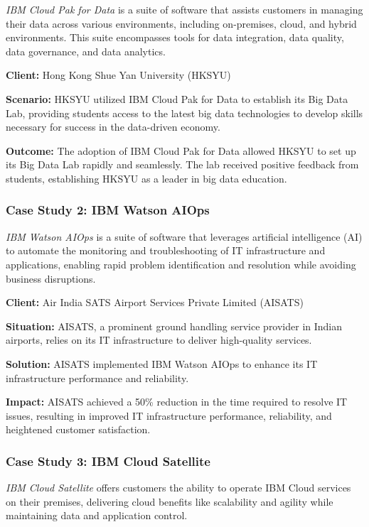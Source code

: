 \textit{IBM Cloud Pak for Data} is a suite of software that assists customers in managing their data across various environments, including on-premises, cloud, and hybrid environments. This suite encompasses tools for data integration, data quality, data governance, and data analytics.

\textbf{Client:} Hong Kong Shue Yan University (HKSYU)

\textbf{Scenario:} HKSYU utilized IBM Cloud Pak for Data to establish its Big Data Lab, providing students access to the latest big data technologies to develop skills necessary for success in the data-driven economy.

\textbf{Outcome:} The adoption of IBM Cloud Pak for Data allowed HKSYU to set up its Big Data Lab rapidly and seamlessly. The lab received positive feedback from students, establishing HKSYU as a leader in big data education.

\subsubsection{Case Study 2: IBM Watson AIOps}

\textit{IBM Watson AIOps} is a suite of software that leverages artificial intelligence (AI) to automate the monitoring and troubleshooting of IT infrastructure and applications, enabling rapid problem identification and resolution while avoiding business disruptions.

\textbf{Client:} Air India SATS Airport Services Private Limited (AISATS)

\textbf{Situation:} AISATS, a prominent ground handling service provider in Indian airports, relies on its IT infrastructure to deliver high-quality services.

\textbf{Solution:} AISATS implemented IBM Watson AIOps to enhance its IT infrastructure performance and reliability.

\textbf{Impact:} AISATS achieved a 50\% reduction in the time required to resolve IT issues, resulting in improved IT infrastructure performance, reliability, and heightened customer satisfaction.

\subsubsection{Case Study 3: IBM Cloud Satellite}

\textit{IBM Cloud Satellite} offers customers the ability to operate IBM Cloud services on their premises, delivering cloud benefits like scalability and agility while maintaining data and application control.

